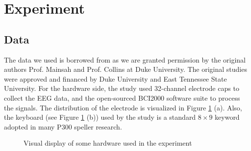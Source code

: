 \documentclass{article}
\begin{document}
\section{Experiment} \label{Experiment}
\subsection{Data} \label{Data}
The data we used is borrowed from \cite{mainsah2014utilizing} as we are granted permission by the original authors Prof. Mainsah and Prof. Collins at Duke University. The original studies were approved and financed by Duke University and East Tennessee State University. For the hardware side, the study used 32-channel electrode caps to collect the EEG data, and the open-sourced BCI2000 software suite to process the signals. The distribution of the electrode is visualized in Figure \ref{fig:7} (a). Also, the keyboard (see Figure \ref{fig:7} (b)) used by the study is a standard $8 \times 9$ keyword adopted in many P300 speller research.

\vspace{-3mm}
\begin{figure}[H]
	\centering
	\qquad
	\hspace{-8mm}
	\caption{Visual display of some hardware used in the experiment}
	\label{fig:7}
\end{figure}
\end{document}
